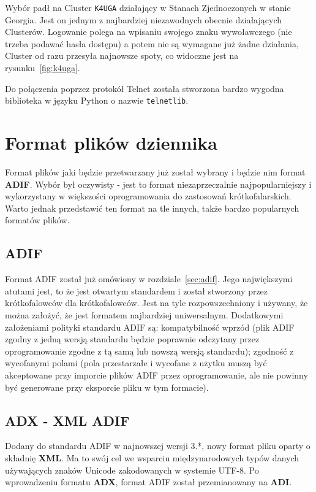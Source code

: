 \documentclass[]{mgr}
\begin{document}
        Wybór padł na Cluster \texttt{K4UGA} działający w Stanach Zjednoczonych w stanie Georgia. Jest on jednym z najbardziej niezawodnych obecnie działających Clusterów. Logowanie polega na wpisaniu swojego znaku wywoławczego (nie trzeba podawać hasła dostępu) a potem nie są wymagane już żadne działania, Cluster od razu przesyła najnowsze spoty, co widoczne jest na rysunku~\ref{fig:k4uga}.

        Do połączenia poprzez protokół Telnet została stworzona bardzo wygodna biblioteka w języku Python o nazwie \texttt{telnetlib}.

        \section{Format plików dziennika}
        Format plików jaki będzie przetwarzany już został wybrany i będzie nim format \textbf{ADIF}. Wybór był oczywisty - jest to format niezaprzeczalnie najpopularniejszy i wykorzystany w większości oprogramowania do zastosowań krótkofalarskich. Warto jednak przedstawić ten format na tle innych, także bardzo popularnych formatów plików.

            \subsection{ADIF}
            Format ADIF został już omówiony w rozdziale~\ref{sec:adif}. Jego największymi atutami jest, to że jest otwartym standardem i został stworzony przez krótkofalowców dla krótkofalowców. Jest na tyle rozpowszechniony i używany, że można założyć, że jest formatem najbardziej uniwersalnym. Dodatkowymi założeniami polityki standardu ADIF są: kompatybilność wprzód (plik ADIF zgodny z jedną wersją standardu będzie poprawnie odczytany przez oprogramowanie zgodne z tą samą lub nowszą wersją standardu); zgodność z wycofanymi polami (pola przestarzałe i wycofane z użytku muszą być akceptowane przy imporcie plików ADIF przez oprogramowanie, ale nie powinny być generowane przy eksporcie pliku w tym formacie).

            \subsection{ADX - XML ADIF}
            Dodany do standardu ADIF w najnowszej wersji 3.*, nowy format pliku oparty o składnię \textbf{XML}. Ma to swój cel we wsparciu międzynarodowych typów danych używających znaków Unicode zakodowanych w systemie UTF-8. Po wprowadzeniu formatu \textbf{ADX}, format ADIF został przemianowany na \textbf{ADI}.
\end{document}
